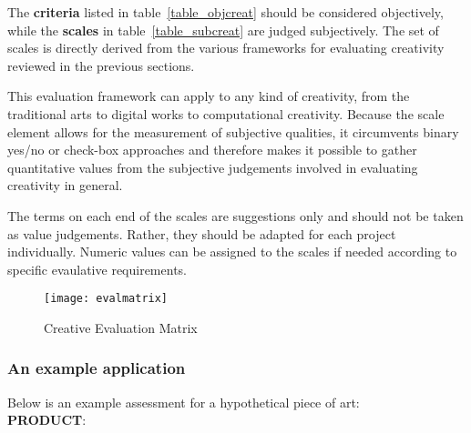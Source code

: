 The \textbf{criteria} listed in table~\ref{table_objcreat} should be considered objectively, while the \textbf{scales} in table~\ref{table_subcreat} are judged subjectively. The set of scales is directly derived from the various frameworks for evaluating creativity reviewed in the previous sections.

This evaluation framework can apply to any kind of creativity, from the traditional arts to digital works to computational creativity. Because the scale element allows for the measurement of subjective qualities, it circumvents binary yes/no or check-box approaches and therefore makes it possible to gather quantitative values from the subjective judgements involved in evaluating creativity in general.

The terms on each end of the scales are suggestions only and should not be taken as value judgements. Rather, they should be adapted for each project individually. Numeric values can be assigned to the scales if needed according to specific evaulative requirements.


\begin{figure}[htb]
  \centering
  \texttt{[image: evalmatrix]}
  \caption[Evaluation Matrix]{Creative Evaluation Matrix}
\label{evalmatrix}
\end{figure}


\subsubsection{An example application}

Below is an example assessment for a hypothetical piece of art:\\

\noindent \textbf{PRODUCT}:\\
  \\
  \\
  \\
  \\
  \\
  \\
  \\


